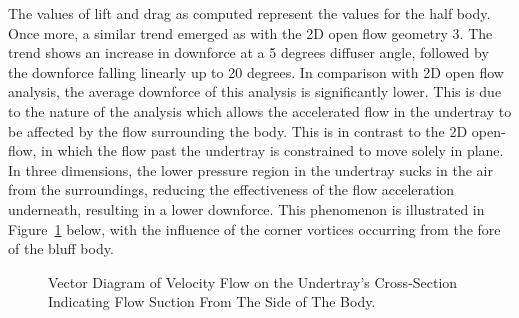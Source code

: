 \noindent The values of lift and drag as computed represent the values for the half body. Once more, a similar trend emerged as with the 2D open flow geometry 3. The trend shows an increase in downforce at a 5 degrees diffuser angle, followed by the downforce falling linearly up to 20 degrees. In comparison with 2D open flow analysis, the average downforce of this analysis is significantly lower. This is due to the nature of the analysis which allows the accelerated flow in the undertray to be affected by the flow surrounding the body. This is in contrast to the 2D open-flow, in which the flow past the undertray is constrained to move solely in plane. In three dimensions, the lower pressure region in the undertray sucks in the air from the surroundings, reducing the effectiveness of the flow acceleration underneath, resulting in a lower downforce. This phenomenon is illustrated in Figure~\ref{fig:Vector_suction_diagram} below, with the influence of the corner vortices occurring from the fore of the bluff body. 

\begin{figure}[!htb]
    \centering
    \noindent{}
    \caption{Vector Diagram of Velocity Flow on the Undertray's Cross-Section Indicating Flow Suction From The Side of The Body.}
    \label{fig:Vector_suction_diagram}
\end{figure}

